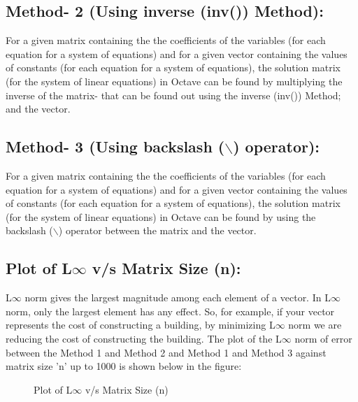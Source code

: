 \documentclass[12pt,a4paper]{article}
\begin{document}
\subsection{Method- 2 (Using inverse (inv()) Method):}
For a given matrix containing the the coefficients of the variables (for each equation for a system of equations) and for a given vector containing the values of constants (for each equation for a system of equations), the solution matrix (for the system of linear equations) in Octave can be found by multiplying the inverse of the matrix- that can be found out using the inverse (inv()) Method; and the vector.
\subsection{Method- 3 (Using backslash ($\backslash$) operator):}
For a given matrix containing the the coefficients of the variables (for each equation for a system of equations) and for a given vector containing the values of constants (for each equation for a system of equations), the solution matrix (for the system of linear equations) in Octave can be found by using the backslash ($\backslash$) operator between the matrix and the vector.
\subsection{Plot of L$\infty$ v/s Matrix Size (n):}
L$\infty$ norm gives the largest magnitude among each element of a vector. In L$\infty$ norm, only the largest element has any effect. So, for example, if your vector represents the cost of constructing a building, by minimizing L$\infty$ norm we are reducing the cost of constructing the building. The plot of the L$\infty$  norm of error between the Method 1 and Method 2 and Method 1 and Method 3 against matrix size ’n’ up to 1000 is shown below in the figure:
\begin{figure}[!ht]
	\begin{center}
	\end{center}
	\caption{Plot of L$\infty$ v/s Matrix Size (n)}
\end{figure}
\end{document}
